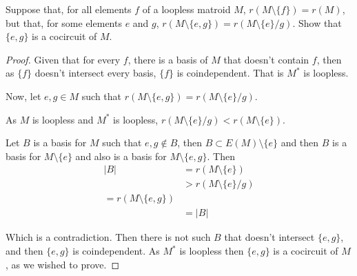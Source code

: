 \prob
{
	Suppose that, for all elements $f$ of a loopless matroid $M$, $r(M\setminus \{f\}) = r(M)$, but that,
	for some elements $e$ and $g$, $r(M \setminus \{e, g\}) = r(M \setminus \{e\} / g)$. Show that $\{e, g\}$
	is a cocircuit of $M$.
}
\begin{proof}
    Given that for every $f$, there is a basis of $M$ that doesn't contain $f$, then as $\{f\}$ doesn't
    intersect every basis, $\{f\}$ is coindependent. That is $M^*$ is loopless.\pn
    
    Now, let $e, g \in M$ such that $r(M \setminus \{e, g\}) = r(M \setminus \{e\} / g)$.\pn
    
    As $M$ is loopless and $M^*$ is loopless, $r(M \setminus \{e\} / g) < r (M \setminus \{e\})$.\pn
    
    Let $B$ is a basis for $M$ such that $e, g \notin B$, then $B \subset E(M) \setminus \{e\}$ and then
    $B$ is a basis for $M \setminus \{e\}$ and also is a basis for $M \setminus \{e, g\}$. Then
        \begin{align}
                |B| &=  r(M \setminus \{e\})        \\
                    &>  r(M \setminus \{e\} / g)    \\
                    =   r(M \setminus \{e, g\})     \\
                    &=  |B|
        \end{align}
        
    Which is a contradiction. Then there is not such $B$ that doesn't intersect $\{e, g\}$, and then $\{e, g\}$ is
    coindependent. As $M^*$ is loopless then $\{e, g\}$ is a cocircuit of $M$, as we wished to prove.
\end{proof}